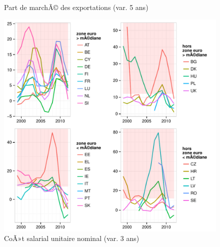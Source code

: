 \documentclass{article}\usepackage[]{graphicx}\usepackage[]{color}
\makeatletter
\def\maxwidth{ %
  \ifdim\Gin@nat@width>\linewidth
    \linewidth
  \else
    \Gin@nat@width
  \fi
}
\newenvironment{knitrout}{}{} %
\makeatother
\begin{document}
\begin{knitrout}
\begin{figure}[p]
{}

\caption[Part de marchÃ© des exportations (var]{Part de marchÃ© des exportations (var. 5 ans)\label{fig:byind4}}
\end{figure}

\begin{figure}[p]


{\centering \includegraphics[width=\maxwidth]{figure_graph/byind5} 

}

\caption[CoÃ»t salarial unitaire nominal (var]{CoÃ»t salarial unitaire nominal (var. 3 ans)\label{fig:byind5}}
\end{figure}

\begin{figure}[p]



\end{figure}
\end{knitrout}
\end{document}
